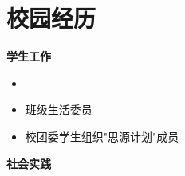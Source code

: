 \section*{校园经历}
\begin{minipage}{0.55\textwidth}  %
\textbf{学生工作}
\begin{itemize}[leftmargin=*,itemsep=0.1em,topsep=0.1em]
\item {}
\item 班级生活委员
\item 校团委学生组织"思源计划"成员
\end{itemize}
\end{minipage}
\begin{minipage}{0.42\textwidth}  %
\textbf{社会实践}
\end{minipage} 